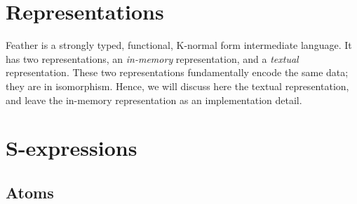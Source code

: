\documentclass[UKenglish, 11pt, a4paper, parskip=half]{scrbook}
\begin{document}
\section{Representations}

Feather is a strongly typed, functional, K-normal form intermediate language. It has two representations, an \textit{in-memory} representation, and a \textit{textual} representation.
These two representations fundamentally encode the same data; they are in isomorphism.
Hence, we will discuss here the textual representation, and leave the in-memory representation as an implementation detail.

\section{S-expressions}

\subsection{Atoms}
\end{document}
